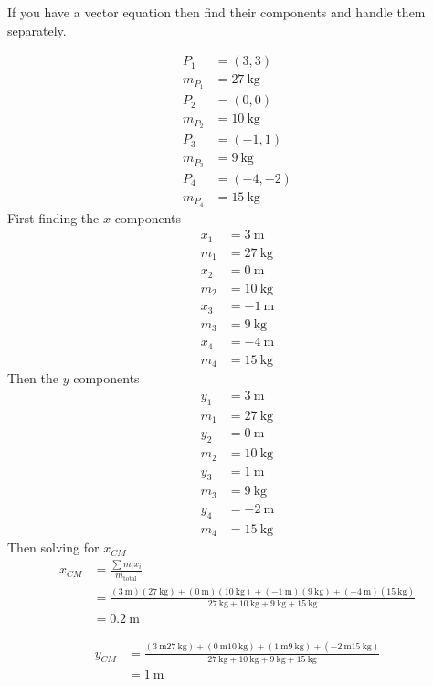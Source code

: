 \documentclass{article}
\begin{document}
If you have a vector equation then find their components and handle them separately.

\begin{align*}
    P_1 & = (3, 3) \\
    m_{P_1} & = \SI{27}{\kg} \\
    P_2 & = (0, 0) \\
    m_{P_2} & = \SI{10}{\kg} \\
    P_3 & = (-1, 1) \\
    m_{P_3} & = \SI{9}{\kg} \\
    P_4 & = (-4, -2) \\
    m_{P_4} & = \SI{15}{\kg}
\end{align*}
First finding the $ x $ components
\begin{align*}
    x_1 & = \SI{3}{\m} \\
    m_1 & = \SI{27}{\kg} \\
    x_2 & = \SI{0}{\m} \\
    m_2 & = \SI{10}{\kg} \\
    x_3 & = \SI{-1}{\m} \\
    m_3 & = \SI{9}{\kg} \\
    x_4 & = \SI{-4}{\m} \\
    m_4 & = \SI{15}{\kg}
\end{align*}
Then the $ y $ components
\begin{align*}
    y_1 & = \SI{3}{\m} \\
    m_1 & = \SI{27}{\kg} \\
    y_2 & = \SI{0}{\m} \\
    m_2 & = \SI{10}{\kg} \\
    y_3 & = \SI{1}{\m} \\
    m_3 & = \SI{9}{\kg} \\
    y_4 & = \SI{-2}{\m} \\
    m_4 & = \SI{15}{\kg}
\end{align*}
Then solving for $ x_{CM} $
\begin{align*}
    x_{CM} & = \frac{\sum m_ix_i}{m_{\text{total}}} \\
           & = \frac{(\SI{3}{\m})(\SI{27}{\kg}) + (\SI{0}{\m})(\SI{10}{\kg}) + (\SI{-1}{\m})(\SI{9}{\kg}) + (\SI{-4}{\m})(\SI{15}{\kg})}{\SI{27}{\kg} + \SI{10}{\kg} + \SI{9}{\kg} + \SI{15}{\kg}} \\
           & = \SI{0.2}{\m}
\end{align*}

\begin{align*}
    y_{CM} & = \frac{ (\SI{3}{\m}\SI{27}{\kg}) + (\SI{0}{\m}\SI{10}{\kg}) + (\SI{1}{\m}\SI{9}{\kg}) + (\SI{-2}{\m}\SI{15}{\kg}) }{ \SI{27}{\kg} + \SI{10}{\kg} + \SI{9}{\kg} + \SI{15}{\kg} } \\
    & = \SI{1}{\m}
\end{align*}
\end{document}
